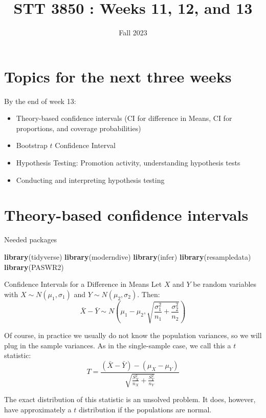 \documentclass[
  ignorenonframetext,
]{beamer}
\title{STT 3850 : Weeks 11, 12, and 13}
\author{Fall 2023}
\date{}
\institute{Appalachian State University}
\newenvironment{Shaded}{\begin{snugshade}}{\end{snugshade}}
\newcommand{\FunctionTok}[1]{\textcolor[rgb]{0.13,0.29,0.53}{\textbf{#1}}}
\newcommand{\NormalTok}[1]{#1}
\providecommand{\tightlist}{%
  \setlength{\itemsep}{0pt}\setlength{\parskip}{0pt}}
\begin{document}
\frame{\titlepage}

\hypertarget{topics-for-the-next-three-weeks}{%
\section{Topics for the next three
weeks}\label{topics-for-the-next-three-weeks}}

\begin{frame}{By the end of week 13:}
\protect\hypertarget{by-the-end-of-week-13}{}
\begin{itemize}
\tightlist
\item
  Theory-based confidence intervals (CI for difference in Means, CI for
  proportions, and coverage probabilities)
\item
  Bootstrap \(t\) Confidence Interval
\item
  Hypothesis Testing: Promotion activity, understanding hypothesis tests
\item
  Conducting and interpreting hypothesis testing
\end{itemize}
\end{frame}

\hypertarget{theory-based-confidence-intervals}{%
\section{Theory-based confidence
intervals}\label{theory-based-confidence-intervals}}

\begin{frame}[fragile]{Needed packages}
\protect\hypertarget{needed-packages}{}
\begin{Shaded}
\begin{Highlighting}[]
\FunctionTok{library}\NormalTok{(tidyverse)}
\FunctionTok{library}\NormalTok{(moderndive)}
\FunctionTok{library}\NormalTok{(infer)}
\FunctionTok{library}\NormalTok{(resampledata)}
\FunctionTok{library}\NormalTok{(PASWR2)}
\end{Highlighting}
\end{Shaded}
\end{frame}

\begin{frame}{Confidence Intervals for a Difference in Means}
\protect\hypertarget{confidence-intervals-for-a-difference-in-means}{}
Let \(X\) and \(Y\) be random variables with
\(X\sim N(\mu_1, \sigma_1)\) and \(Y\sim N(\mu_2, \sigma_2)\). Then:
\[\bar{X}-\bar{Y}\sim N\left(\mu_1-\mu_2, \sqrt{\frac{\sigma_1^2}{n_1}+\frac{\sigma_2^2}{n_2}}\right)\]

Of course, in practice we usually do not know the population variances,
so we will plug in the sample variances. As in the single-sample case,
we call this a \(t\) statistic:
\[T=\frac{(\bar{X}-\bar{Y})-(\mu_X-\mu_Y)}{\sqrt{\frac{S^2_X}{n_X}+\frac{S^2_Y}{n_Y}}}\]

The exact distribution of this statistic is an unsolved problem. It
does, however, have approximately a \(t\) distribution if the
populations are normal.
\end{frame}
\end{document}
